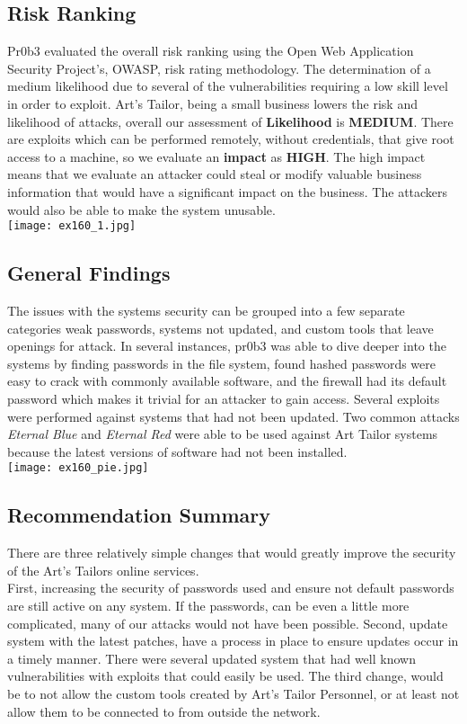 \documentclass[notitlepage]{article}
\begin{document}
	\subsection{Risk Ranking}
	\indent \indent Pr0b3 evaluated the overall risk ranking using the Open Web Application Security Project's, OWASP, risk rating methodology. The determination of a medium likelihood due to several of the vulnerabilities requiring a low skill level in order to exploit. Art's Tailor, being a small business lowers the risk and likelihood of attacks, overall our assessment of \textbf{Likelihood} is \textbf{MEDIUM}.  There are exploits which can be performed remotely, without credentials, that give root access to a machine, so we evaluate an \textbf{impact} as \textbf{HIGH}.  The high impact means that we evaluate an attacker could steal or modify valuable business information that would have a significant impact on the business. The attackers would also be able to make the system unusable.  \\
	\texttt{[image: ex160\_1.jpg]} \\
	
	\subsection{General Findings}
	\indent \indent The issues with the systems security can be grouped into a few separate categories weak passwords, systems not updated, and custom tools that leave openings for attack.  In several instances, pr0b3 was able to dive deeper into the systems by finding passwords in the file system, found hashed passwords were easy to crack with commonly available software, and the firewall had its default password which makes it trivial for an attacker to gain access.  Several exploits were performed against systems that had not been updated. Two common attacks \textit{Eternal Blue} and \textit{Eternal Red} were able to be used against Art Tailor systems because the latest versions of software had not been installed. \\ 
	\texttt{[image: ex160\_pie.jpg]} \\
	
	
	\subsection{Recommendation Summary}
	\indent \indent There are three relatively simple changes that would greatly improve the security of the Art's Tailors online services. \\ 
	\indent First, increasing the security of passwords used and ensure not default passwords are still active on any system.  If the passwords, can be even a little more complicated, many of our attacks would not have been possible. Second, update system with the latest patches, have a process in place to ensure updates occur in a timely manner. There were several updated system that had well known vulnerabilities with exploits that could easily be used. The third change, would be to not allow the custom tools created by Art's Tailor Personnel, or at least not allow them to be connected to from outside the network. 
	
\end{document}
